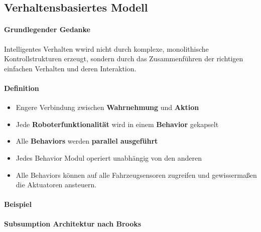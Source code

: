 \subsection{Verhaltensbasiertes Modell}
\paragraph{Grundlegender Gedanke} Intelligentes Verhalten wwird nicht durch komplexe, monolithische Kontrollstrukturen erzeugt, sondern durch das Zusammenführen der richtigen einfachen Verhalten und deren Interaktion.
\paragraph{Definition}
\begin{itemize}
	\item Engere Verbindung zwischen \textbf{Wahrnehmung} und \textbf{Aktion}
	\item Jede \textbf{Roboterfunktionalität} wird in einem \textbf{Behavior} gekapselt
	\item Alle \textbf{Behaviors} werden \textbf{parallel ausgeführt}
	\item Jedes Behavior Modul operiert unabhängig von den anderen
	\item Alle Behaviors können auf alle Fahrzeugsensoren zugreifen und gewissermaßen die Aktuatoren ansteuern.
\end{itemize}
\paragraph{Beispiel}
\textbf{Subsumption Architektur nach Brooks}
\newpage
